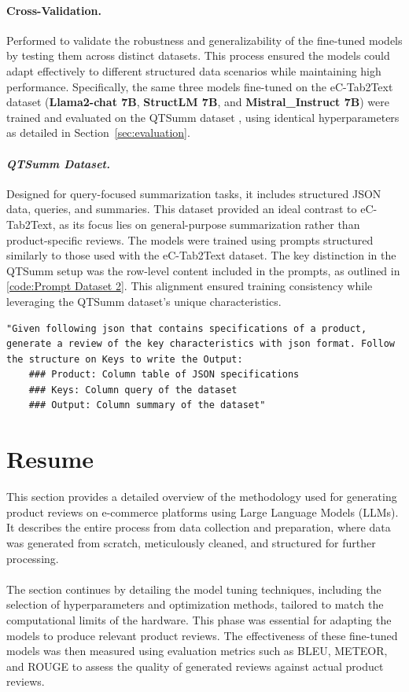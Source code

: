 \paragraph{Cross-Validation.} Performed to validate the robustness and generalizability of the fine-tuned models by testing them across distinct datasets. This process ensured the models could adapt effectively to different structured data scenarios while maintaining high performance. Specifically, the same three models fine-tuned on the eC-Tab2Text dataset (\textbf{Llama2-chat 7B}, \textbf{StructLM 7B}, and \textbf{Mistral\_Instruct 7B}) were trained and evaluated on the QTSumm dataset \cite{zhao2023qtsummqueryfocusedsummarizationtabular}, using identical hyperparameters as detailed in Section~\ref{sec:evaluation}.
\paragraph{\textit{QTSumm Dataset.}\label{par:Prompt QTSumm}\cite{zhao2023qtsummqueryfocusedsummarizationtabular}} Designed for query-focused summarization tasks, it includes structured JSON data, queries, and summaries. This dataset provided an ideal contrast to eC-Tab2Text, as its focus lies on general-purpose summarization rather than product-specific reviews. The models were trained using prompts structured similarly to those used with the eC-Tab2Text dataset. The key distinction in the QTSumm setup was the row-level content included in the prompts, as outlined in \ref{code:Prompt Dataset 2}. This alignment ensured training consistency while leveraging the QTSumm dataset's unique characteristics.

\begin{lstlisting}[style=textstyle, frame = single, caption=Prompt structuration for QTSumm, label=code:Prompt Dataset 2]
    "Given following json that contains specifications of a product, generate a review of the key characteristics with json format. Follow the structure on Keys to write the Output: 
    ### Product: Column table of JSON specifications
    ### Keys: Column query of the dataset
    ### Output: Column summary of the dataset"
    \end{lstlisting}

\section{Resume}
This section provides a detailed overview of the methodology used for generating product reviews on e-commerce platforms using Large Language Models (LLMs). It describes the entire process from data collection and preparation, where data was generated from scratch, meticulously cleaned, and structured for further processing.
\\\\
The section continues by detailing the model tuning techniques, including the selection of hyperparameters and optimization methods, tailored to match the computational limits of the hardware. This phase was essential for adapting the models to produce relevant product reviews. The effectiveness of these fine-tuned models was then measured using evaluation metrics such as BLEU, METEOR, and ROUGE to assess the quality of generated reviews against actual product reviews.